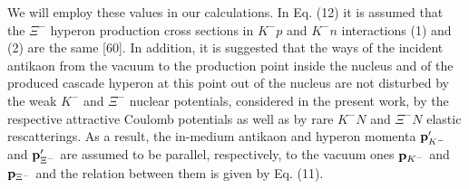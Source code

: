 \documentclass[12pt]{article}
\begin{document}
We will employ these values in our calculations. In Eq. (12) it is assumed that the $\Xi^-$ hyperon
production cross sections in $K^-p$ and $K^-n$ interactions (1) and (2) are the same [60].
In addition, it is suggested that the ways of the incident antikaon from the vacuum to the production
point inside the nucleus and of the produced cascade hyperon at this point out of the nucleus are not
disturbed by the weak $K^-$ and $\Xi^-$ nuclear potentials, considered in the present work, by the respective
attractive Coulomb potentials as well as by rare $K^-N$ and ${\Xi^-}N$ elastic rescatterings. As a result,
the in-medium antikaon and hyperon momenta ${\bf p}^{\prime}_{K^-}$ and ${\bf p}^{\prime}_{\Xi^-}$
are assumed to be parallel, respectively, to the vacuum ones ${\bf p}_{K^-}$ and ${\bf p}_{\Xi^-}$
and the relation between them is given by Eq. (11).
\end{document}
